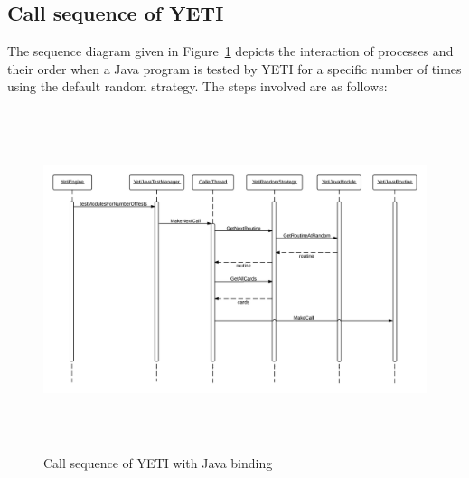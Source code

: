 \subsection{Call sequence of YETI}
The sequence diagram given in Figure~\ref{fig:yetiSequenceDiagram} depicts the interaction of processes and their order when a Java program is tested by YETI for a specific number of times using the default random strategy.  The steps involved are as follows:

\bigskip
\begin{figure}[H]
	\centering
	\includegraphics[width=15cm, height=10cm]{chapter3/sequenceDiagram.png}
	\bigskip
	\caption{Call sequence of YETI with Java binding}
	\label{fig:yetiSequenceDiagram}
\end{figure}
\bigskip

